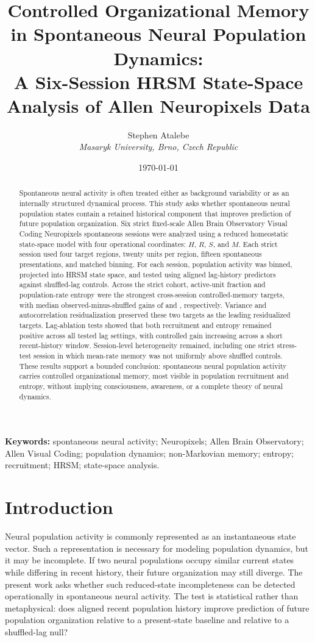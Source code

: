 \documentclass[11pt]{article}
\title{Controlled Organizational Memory in Spontaneous Neural Population Dynamics:\\
A Six-Session HRSM State-Space Analysis of Allen Neuropixels Data}
\author{Stephen Atalebe\\
\emph{Masaryk University, Brno, Czech Republic}}
\date{\today}
\begin{document}
\maketitle

\begin{abstract}
Spontaneous neural activity is often treated either as background variability or as an internally structured dynamical process. This study asks whether spontaneous neural population states contain a retained historical component that improves prediction of future population organization. Six strict fixed-scale Allen Brain Observatory Visual Coding Neuropixels spontaneous sessions were analyzed using a reduced homeostatic state-space model with four operational coordinates: \(H\), \(R\), \(S\), and \(M\). Each strict session used four target regions, twenty units per region, fifteen spontaneous presentations, and matched binning. For each session, population activity was binned, projected into HRSM state space, and tested using aligned lag-history predictors against shuffled-lag controls. Across the strict cohort, active-unit fraction and population-rate entropy were the strongest cross-session controlled-memory targets, with median observed-minus-shuffled gains of \StrictActiveMedianGain{} and \StrictEntropyMedianGain{}, respectively. Variance and autocorrelation residualization preserved these two targets as the leading residualized targets. Lag-ablation tests showed that both recruitment and entropy remained positive across all tested lag settings, with controlled gain increasing across a short recent-history window. Session-level heterogeneity remained, including one strict stress-test session in which mean-rate memory was not uniformly above shuffled controls. These results support a bounded conclusion: spontaneous neural population activity carries controlled organizational memory, most visible in population recruitment and entropy, without implying consciousness, awareness, or a complete theory of neural dynamics.
\end{abstract}

\noindent\textbf{Keywords:} spontaneous neural activity; Neuropixels; Allen Brain Observatory; Allen Visual Coding; population dynamics; non-Markovian memory; entropy; recruitment; HRSM; state-space analysis.

\section{Introduction}

Neural population activity is commonly represented as an instantaneous state vector. Such a representation is necessary for modeling population dynamics, but it may be incomplete. If two neural populations occupy similar current states while differing in recent history, their future organization may still diverge. The present work asks whether such reduced-state incompleteness can be detected operationally in spontaneous neural activity. The test is statistical rather than metaphysical: does aligned recent population history improve prediction of future population organization relative to a present-state baseline and relative to a shuffled-lag null?
\end{document}
